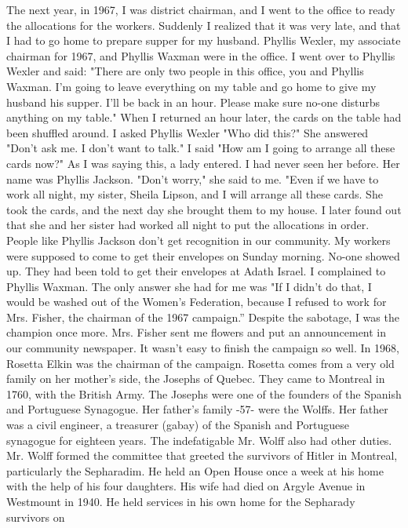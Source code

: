 The next year, in 1967, I was district chairman, and I went to 
the office to ready the allocations for the workers.
Suddenly I realized 
that it was very late, and that I had to go home to prepare supper for my 
husband.
Phyllis Wexler, my associate chairman for 1967, and Phyllis Waxman were in the office.
I went over to Phyllis Wexler and said: "There are only two people in this office, you and Phyllis Waxman.
I'm going to leave everything on my table and go home to give my husband his supper.
I’ll be back in an hour.
Please make sure no-one disturbs anything on my table."
When I returned an hour later, the cards on the table had been shuffled 
around.
I asked Phyllis Wexler "Who did this?"
She answered "Don't ask me.
I don't want to talk."
I said "How am I going to arrange all these cards now?"
As I was saying this, a lady entered.
I had never seen her before.
Her name was Phyllis Jackson.
"Don't worry," she said to me.
"Even if we have to work all night, my sister, Sheila Lipson, and I will arrange all these cards.
She took the cards, and the next day she brought them to my house.
I later found out that she and her sister had worked all night to put the allocations in order.
People like Phyllis Jackson don't get recognition in our community.
My workers were supposed to come to get their envelopes on Sunday morning.
No-one showed up.
They had been told to get their envelopes at 
Adath Israel.
I complained to Phyllis Waxman.
The only answer she had for me was "If I didn't do that, I would be washed out of the Women's Federation, because I refused to work for Mrs.
Fisher, the chairman of the 1967 campaign.” Despite the sabotage, I was the champion once more.
Mrs.
Fisher sent me flowers and put an announcement in our community newspaper.
It 
wasn't easy to finish the campaign so well.
In 1968, Rosetta Elkin was the chairman of the campaign.
Rosetta comes 
from a very old family on her mother's side, the Josephs of Quebec.
They 
came to Montreal in 1760, with the British Army.
The Josephs were one of 
the founders of the Spanish and Portuguese Synagogue.
Her father's family 
-57- 
were the Wolffs.
Her father was a civil engineer, a treasurer
(gabay) of the Spanish and Portuguese synagogue for eighteen years.
The indefatigable Mr.
Wolff also had other duties.
Mr.
Wolff formed the committee that greeted the survivors of Hitler in Montreal, particularly the Sepharadim.
He held an Open House once a week at his home with the help of his four daughters.
His wife had died on Argyle Avenue in Westmount 
in 1940.
He held services in his own home for the Sepharady survivors on 
